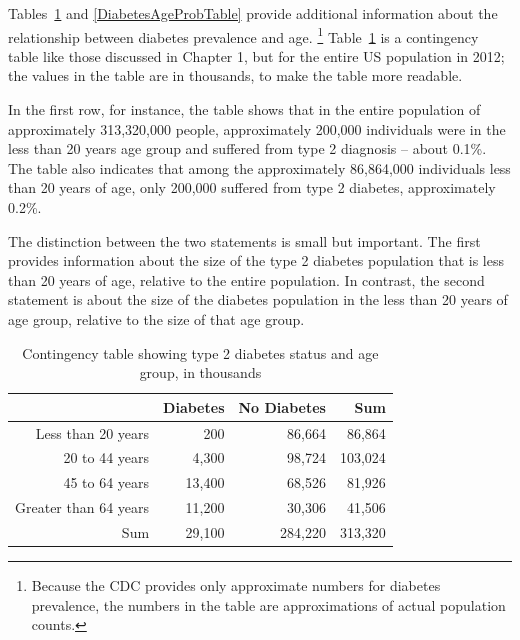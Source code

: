 \begin{doublespace}


Tables~\ref{DiabetesAgeContTable} and \ref{DiabetesAgeProbTable} provide additional information about the relationship between diabetes prevalence and age.  \footnote{Because the CDC provides only approximate numbers for diabetes prevalence, the numbers in the table are approximations of actual population counts.} Table~\ref{DiabetesAgeContTable} is a contingency table like those discussed in Chapter 1, but for the entire US population in 2012; the values in the table are in thousands, to make the table more readable.  

In the first row, for instance, the table shows that in the entire population of approximately 313,320,000 people, approximately 200,000 individuals were in the less than 20 years age group and suffered from type 2 diagnosis -- about 0.1\%. The table also indicates that among the approximately 86,864,000 individuals less than 20 years of age, only 200,000 suffered from type 2 diabetes, approximately 0.2\%. 

The distinction between the two statements is small but important. The first provides information about the size of the type 2 diabetes population that is less than 20 years of age, relative to the entire population. In contrast, the second statement is about the size of the diabetes population in the less than 20 years of age group, relative to the size of that age group. 

\begin{table}[ht]
	\centering
	\begin{tabular}{rrrr}
		\hline
		& Diabetes & No Diabetes & Sum \\ 
		\hline
		Less than 20 years & 200 & 86,664 & 86,864 \\ 
		20 to 44 years & 4,300 & 98,724 & 103,024 \\ 
		45 to 64 years & 13,400 & 68,526 & 81,926 \\ 
		Greater than 64 years & 11,200 & 30,306 & 41,506 \\ 
		Sum & 29,100 & 284,220 & 313,320 \\ 
		\hline
	\end{tabular}
	\caption{Contingency table showing type 2 diabetes status and age group, in thousands}
	\label{DiabetesAgeContTable}
\end{table}


\end{doublespace}
